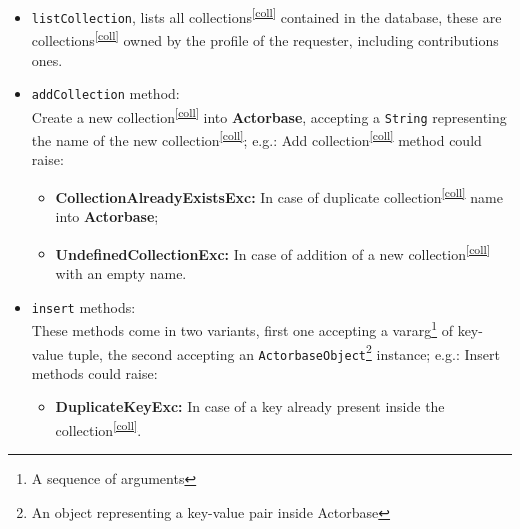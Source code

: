 \documentclass{scalatekids-article}
\begin{document}
\begin{itemize}
\item \verb=listCollection=, lists all collections\textsuperscript{\ref{coll}}
  contained in the database, these are collections\textsuperscript{\ref{coll}}
  owned by the profile of the requester, including contributions ones.
\item \verb=addCollection= method:\\ Create a new collection\textsuperscript{\ref{coll}} into \textbf{Actorbase}, accepting a \verb=String=
  representing the name of the new collection\textsuperscript{\ref{coll}};
  e.g.:
  Add collection\textsuperscript{\ref{coll}} method could raise:
  \begin{itemize}
  \item \textbf{CollectionAlreadyExistsExc:} In case of duplicate collection\textsuperscript{\ref{coll}} name into \textbf{Actorbase};
  \item \textbf{UndefinedCollectionExc:} In case of addition of a new collection\textsuperscript{\ref{coll}} with an empty name.
  \end{itemize}
\item \verb=insert= methods:\\ These methods come in two variants, first one accepting
  a vararg\footnote{A sequence of arguments} of key-value tuple, the second
  accepting an
  \verb=ActorbaseObject=\footnote{An object representing a key-value pair inside Actorbase\label{ABobj}} instance;
  e.g.:
  Insert methods could raise:
  \begin{itemize}
  \item \textbf{DuplicateKeyExc:} In case of a key already present inside the collection\textsuperscript{\ref{coll}}.
  \end{itemize}

\end{itemize}
\end{document}

